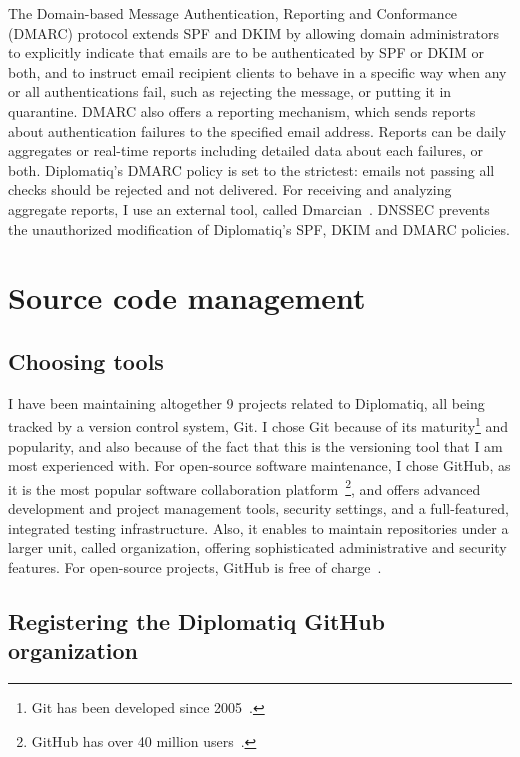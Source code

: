 The Domain-based Message Authentication, Reporting and Conformance (DMARC) protocol extends SPF and DKIM by allowing domain administrators to explicitly indicate that emails are to be authenticated by SPF or DKIM or both, and to instruct email recipient clients to behave in a specific way when any or all authentications fail, such as rejecting the message, or putting it in quarantine. DMARC also offers a reporting mechanism, which sends reports about authentication failures to the specified email address. Reports can be daily aggregates or real-time  reports including detailed data about each failures, or both. Diplomatiq's DMARC policy is set to the strictest: emails not passing all checks should be rejected and not delivered. For receiving and analyzing aggregate reports, I use an external tool, called Dmarcian~\cite{dmarcian-website}. DNSSEC prevents the unauthorized modification of Diplomatiq's SPF, DKIM and DMARC policies.

\section{Source code management}

\subsection{Choosing tools}

I have been maintaining altogether 9 projects related to Diplomatiq, all being tracked by a version control system, Git. I chose Git because of its maturity\footnote{Git has been developed since 2005~\cite{git-initial-commit}.} and popularity, and also because of the fact that this is the versioning tool that I am most experienced with. For open-source software maintenance, I chose GitHub, as it is the most popular software collaboration platform~\footnote{GitHub has over 40 million users~\cite{github-user-count}.}, and offers advanced development and project management tools, security settings, and a full-featured, integrated testing infrastructure. Also, it enables to maintain repositories under a larger unit, called organization, offering sophisticated administrative and security features. For open-source projects, GitHub is free of charge~\cite{github-pricing}.

\subsection{Registering the Diplomatiq GitHub organization}

